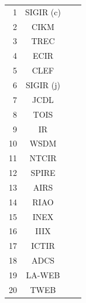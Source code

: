 \begin{table}[htbp]
\begin{tabular}{rccc}
1		&	SIGIR (c)	\\
2		&	CIKM		\\
3		&	TREC		\\
4		&	ECIR		\\
5		&	CLEF		\\
6		&	SIGIR (j)	\\
7		&	JCDL		\\
8		&	TOIS		\\
9		&	IR			\\
10		&	WSDM		\\
11		&	NTCIR		\\
12		&	SPIRE		\\
13		&	AIRS		\\
14		&	RIAO		\\
15		&	INEX		\\
16		&	IIIX		\\
17		&	ICTIR		\\
18		&	ADCS		\\
19		&	LA-WEB		\\
20		&	TWEB		\\
\end{tabular}
\end{table}

